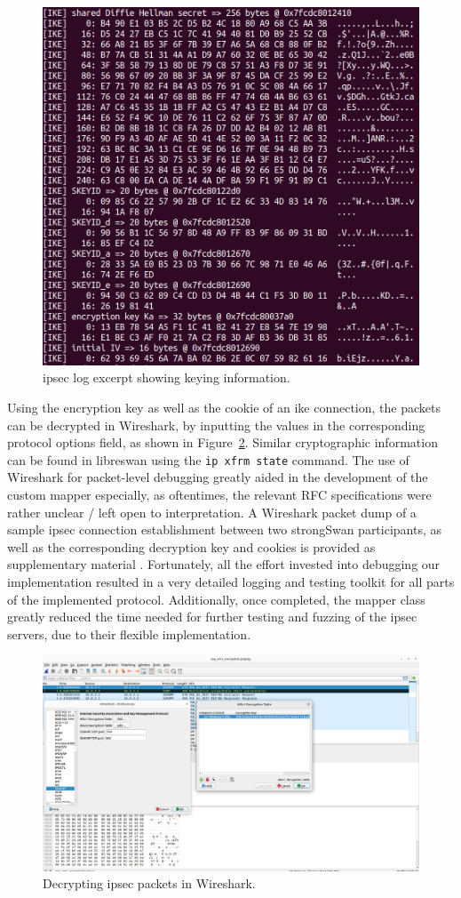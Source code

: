 \begin{figure}
	\centering
	\includegraphics[width=0.7\linewidth]{images/key_material_log}
	\caption{\ac{ipsec} log excerpt showing keying information.}
	\label{fig:keymateriallog}
\end{figure}


Using the encryption key as well as the cookie of an \ac{ike} connection, the packets can be decrypted in Wireshark, by inputting the values in the corresponding protocol options field, as shown in Figure~\ref{fig:wiresharkdecryption}. Similar cryptographic information can be found in libreswan using the \texttt{ip xfrm state} command. The use of Wireshark for packet-level debugging greatly aided in the development of the custom mapper especially, as oftentimes, the relevant RFC specifications were rather unclear / left open to interpretation. A Wireshark packet dump of a sample \ac{ipsec} connection establishment between two strongSwan participants, as well as the corresponding decryption key and cookies is provided as supplementary material . Fortunately, all the effort invested into debugging our implementation resulted in a very detailed logging and testing toolkit for all parts of the implemented protocol. Additionally, once completed, the mapper class greatly reduced the time needed for further testing and fuzzing of the \ac{ipsec} servers, due to their flexible implementation.

\begin{figure}
	\centering
	\includegraphics[width=\linewidth]{images/wireshark_decryption}
	\caption{Decrypting \ac{ipsec} packets in Wireshark.}
	\label{fig:wiresharkdecryption}
\end{figure}

